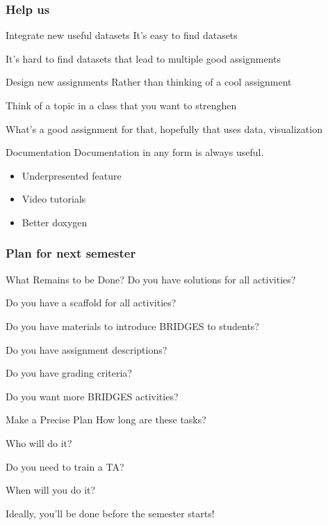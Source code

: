 \documentclass[aspectratio=169]{beamer}
\begin{document}
\begin{frame}
  \frametitle{Help us}
    \begin{block}{Integrate new useful datasets}
      It's easy to find datasets

      It's hard to find datasets that lead to multiple good assignments
    \end{block}

    \begin{block}{Design new assignments}
      Rather than thinking of a cool assignment

      Think of a topic in a class that you want to strenghen

      What's a good assignment for that, hopefully that uses data, visualization      
    \end{block}

    \begin{block}{Documentation}
      Documentation in any form is always useful.
      \begin{itemize}
      \item Underpresented feature
      \item Video tutorials
      \item Better doxygen
      \end{itemize}
    \end{block}
\end{frame}



\begin{frame}
  \frametitle{Plan for next semester}

  \begin{block}{What Remains to be Done?}
    Do you have solutions for all activities?

    Do you have a scaffold for all activities?

    Do you have materials to introduce BRIDGES to students?

    Do you have assignment descriptions?

    Do you have grading criteria?
    
    Do you want more BRIDGES activities?
  \end{block}

  \begin{block}{Make a Precise Plan}
    How long are these tasks?
    
    Who will do it?

    Do you need to train a TA?

    When will you do it?

    Ideally, you'll be done before the semester starts!
  \end{block}
\end{frame}
\end{document}

